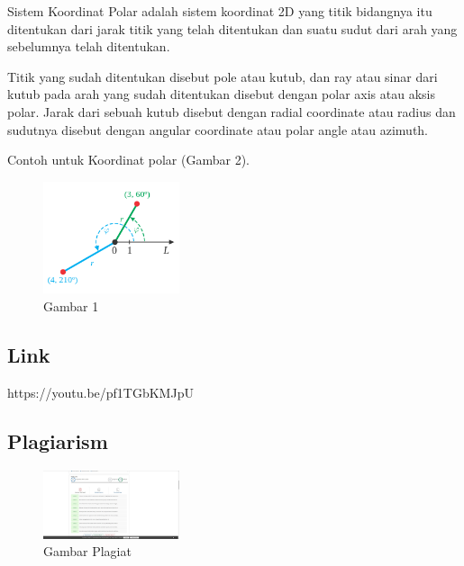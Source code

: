 \begin{itemize}
\begin{enumerate}
Sistem Koordinat Polar adalah sistem koordinat 2D yang titik bidangnya itu ditentukan dari jarak titik yang telah ditentukan dan suatu sudut dari arah yang sebelumnya telah ditentukan.

Titik yang sudah ditentukan disebut pole atau kutub, dan ray atau sinar dari kutub pada arah yang sudah ditentukan disebut dengan polar axis atau aksis polar. Jarak dari sebuah kutub disebut dengan radial coordinate atau radius dan sudutnya disebut dengan angular coordinate atau polar angle atau azimuth.

Contoh untuk Koordinat polar (Gambar 2).
	\begin{figure}[H]
	\includegraphics[width=4cm]{figures/Tugas1/1174070/polar.png}
	\centering
	\caption{Gambar 1}
\end{figure}
	\end{enumerate}
\end{itemize}
\subsection{Link}
https://youtu.be/pf1TGbKMJpU
\subsection{Plagiarism}
\begin{figure}[H]
	\includegraphics[width=4cm]{figures/Tugas1/1174070/plagiat.jpg}
	\centering
	\caption{Gambar Plagiat}
\end{figure}